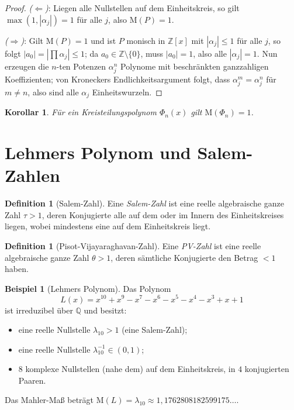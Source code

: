 \documentclass[12pt,a4paper]{amsart}
\newtheorem{korollar}[theorem]{Korollar}
\theoremstyle{definition}
\newtheorem{definition_de}[theorem]{Definition}
\newtheorem{example}[theorem]{Beispiel}
\theoremstyle{remark}
\newcommand{\Z}{\mathbb{Z}}
\newcommand{\Q}{\mathbb{Q}}
\newcommand{\M}{\mathrm{M}}
\begin{document}
\begin{proof}
  \emph{($\Leftarrow$)}: Liegen alle Nullstellen auf dem Einheitskreis, so gilt
  $\max(1,|\alpha_j|) = 1$ für alle $j$, also $\M(P) = 1$.

  \emph{($\Rightarrow$)}: Gilt $\M(P) = 1$ und ist $P$ monisch in $\Z[x]$ mit
  $|\alpha_j| \leq 1$ für alle $j$, so folgt $|a_0| = |\prod \alpha_j| \leq 1$;
  da $a_0 \in \Z \setminus \{0\}$, muss $|a_0| = 1$, also alle $|\alpha_j| = 1$.
  Nun erzeugen die $n$-ten Potenzen $\alpha_j^n$ Polynome mit beschränkten
  ganzzahligen Koeffizienten; von Kroneckers Endlichkeitsargument folgt,
  dass $\alpha_j^m = \alpha_j^n$ für $m \neq n$, also sind alle $\alpha_j$
  Einheitswurzeln.
\end{proof}

\begin{korollar}
  Für ein Kreisteilungspolynom $\Phi_n(x)$ gilt $\M(\Phi_n) = 1$.
\end{korollar}

\section{Lehmers Polynom und Salem-Zahlen}\label{sec:lehmer_poly}

\begin{definition_de}[Salem-Zahl]
  Eine \emph{Salem-Zahl} ist eine reelle algebraische ganze Zahl $\tau > 1$, deren
  Konjugierte alle auf dem oder im Innern des Einheitskreises liegen, wobei mindestens
  eine auf dem Einheitskreis liegt.
\end{definition_de}

\begin{definition_de}[Pisot-Vijayaraghavan-Zahl]
  Eine \emph{PV-Zahl} ist eine reelle algebraische ganze Zahl $\theta > 1$, deren
  sämtliche Konjugierte den Betrag $< 1$ haben.
\end{definition_de}

\begin{example}[Lehmers Polynom]
  Das Polynom
  \[
    L(x) = x^{10}+x^9-x^7-x^6-x^5-x^4-x^3+x+1
  \]
  ist irreduzibel über $\Q$ und besitzt:
  \begin{itemize}
    \item eine reelle Nullstelle $\lambda_{10} > 1$ (eine Salem-Zahl);
    \item eine reelle Nullstelle $\lambda_{10}^{-1} \in (0,1)$;
    \item $8$ komplexe Nullstellen (nahe dem) auf dem Einheitskreis, in $4$
      konjugierten Paaren.
  \end{itemize}
  Das Mahler-Maß beträgt $\M(L) = \lambda_{10} \approx 1{,}1762808182599175\ldots$.
\end{example}
\end{document}
